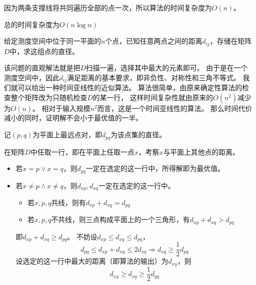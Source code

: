 \documentclass[answers]{exam}
\begin{document}
\begin{questions}
\begin{solution}
        因为两条支撑线将共同遍历全部的点一次，所以算法的时间复杂度为$O(n)$。

        总的时间复杂度为$O(n \log n)$
    \end{solution}

    \question 给定测度空间中位于同一平面的$n$个点，已知任意两点之间的距离$d_{ij}$，存储在矩阵$D$中，求这组点的直径。

    该问题的直观解法就是把$D$扫描一遍，选择其中最大的元素即可。
    由于是在一个测度空间中，因此$d_{ij}$满足距离的基本要求，即非负性、对称性和三角不等式。
    我们就可以给出一种时间亚线性的近似算法。
    算法很简单，由原来确定性算法的检查整个矩阵改为只随机检查$D$的某一行，
    这样时间复杂性就由原来的$O(n^2)$减少为$O(n)$。
    相对于输入规模$n^2$而言，这是一个时间亚线性的算法。
    那么时间代价减小的同时，证明解不会小于最优值的一半。

    \begin{solution}

        \proof 记$(p,q)$为平面上最远点对，即$d_{pq}$为该点集的直径。

        在矩阵$D$中任取一行，即在平面上任取一点$x$，考察$x$与平面上其他点的距离。
        \begin{itemize}
            \item 若$x = p \vee x = q$，则$d_{pq}$一定在选定的这一行中，所得解即为最优值。
            \item 若$x \ne p \wedge x \ne q$，则$d_{xp}, d_{xq}$一定在选定的这一行中。
                  \begin{itemize}
                      \item 若$x,p,q$共线，则有$d_{xp} + d_{xq} = d_{pq}$
                      \item 若$x,p,q$不共线，则三点构成平面上的一个三角形，有$d_{xp} + d_{xq} > d_{pq}$
                  \end{itemize}
                  即$d_{xp} + d_{xq} \ge d_{pq}$。
                  不妨设$d_{xp} \le d_{xq} \le d_{pq}$，\[
                      d_{pq} \le d_{xp} + d_{xq} \le 2d_{xq} \Longrightarrow
                      d_{xq} \ge \frac{1}{2} d_{pq}
                  \]
                  设选定的这一行中最大的距离（即算法的输出）为$d_{xy}$，则\[
                      d_{xy} \ge d_{xq} \ge \frac{1}{2}  d_{pq}
                  \]
        \end{itemize}
    \end{solution}


\end{questions}
\end{document}
